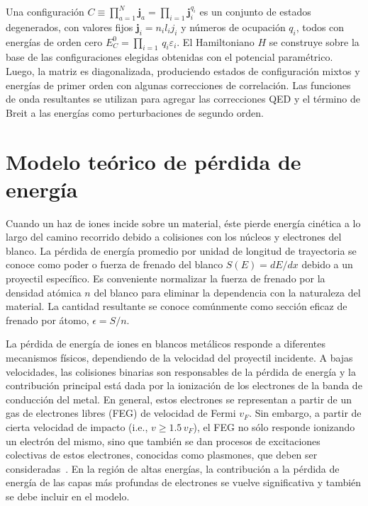 Una configuración 
$C\equiv\prod_{a=1}^N\mathbf{j}_a=\prod_{i=1}\mathbf{j}_i^{q_i}$ es un 
conjunto de estados degenerados, con valores fijos 
$\mathbf{j}_i=n_il_ij_i$
y números de ocupación $q_i$, todos con energías de orden cero 
$E_C^0=\prod_{i=1}\,q_i\varepsilon_i$. 
El Hamiltoniano $H$ se construye sobre la base de las configuraciones 
elegidas obtenidas con el potencial paramétrico. Luego, la matriz es 
diagonalizada, produciendo estados de configuración mixtos y energías 
de primer orden con algunas correcciones de correlación. Las funciones 
de onda resultantes se utilizan para agregar las correcciones QED y el 
término de Breit a las energías como perturbaciones de segundo orden.



\section{Modelo teórico de pérdida de energía}
\label{sec:method-stopping}

Cuando un haz de iones incide sobre un material, éste pierde energía 
cinética a lo largo del camino recorrido debido a colisiones con los 
núcleos y electrones del blanco. La pérdida de energía promedio 
por unidad de longitud de trayectoria se conoce como poder o fuerza de 
frenado del blanco $S(E)=dE/dx$ debido a un proyectil específico. Es 
conveniente normalizar la fuerza de frenado por la densidad atómica 
$n$ del blanco para eliminar la dependencia con la naturaleza del 
material. La cantidad resultante se conoce comúnmente como sección 
eficaz de frenado por átomo, $\epsilon=S/n$. 

La pérdida de energía de iones en blancos metálicos responde a 
diferentes mecanismos físicos, dependiendo de la velocidad del proyectil 
incidente. A bajas velocidades, las colisiones binarias son responsables 
de la pérdida de energía y la contribución principal está dada por la 
ionización de los electrones de la banda de conducción del metal. En 
general, estos electrones se representan a partir de un gas de 
electrones libres (FEG) de velocidad de Fermi $v_F$. Sin embargo, a 
partir de cierta velocidad de impacto (i.e., $v\geq 1.5\,v_F$), el FEG 
no sólo responde ionizando un electrón del mismo, sino que también se 
dan procesos de excitaciones colectivas de estos electrones, conocidas 
como plasmones, que deben ser consideradas~\cite{Montanari:17}. En la 
región de altas energías, la contribución a la pérdida de energía de
las capas más profundas de electrones se vuelve significativa y también 
se debe incluir en el modelo.

